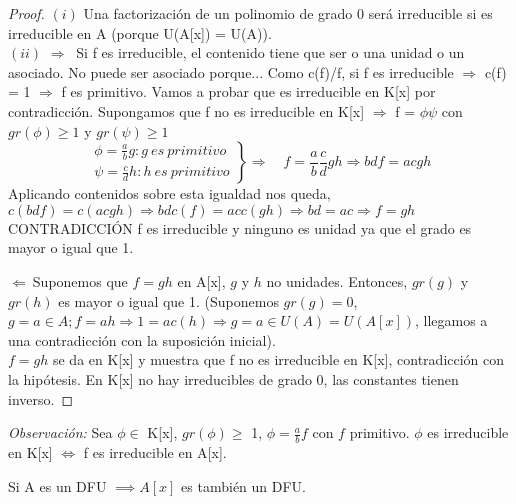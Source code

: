 \begin{proof}
$(i)$ Una factorización de un polinomio de grado 0 será irreducible si es irreducible en A (porque U(A[x]) = U(A)).\\
$(ii)$ $\displaystyle \boxed{\Rightarrow}\ $ Si f es irreducible, el contenido tiene que ser o una unidad o un asociado. No puede ser asociado porque...
Como c(f)/f, si f es irreducible $\Rightarrow$ c(f) = 1 $\Rightarrow$ f es primitivo. Vamos a probar que es irreducible en K[x] por contradicción. Supongamos que f no es irreducible en K[x] $\Rightarrow$ f = $\phi \psi$ con $gr(\phi) \geq 1$ y $gr(\psi) \geq 1$
$$
 \left .
      \begin{matrix}
        \phi =  \frac{a}{b}g : g\ es\ primitivo\\
        \psi =  \frac{c}{d}h : h\ es\ primitivo
      \end{matrix}
   \right \}
   \Longrightarrow \quad f = \frac{a}{b} \frac{c}{d} gh \Rightarrow bdf = acgh
  $$
  Aplicando contenidos sobre esta igualdad nos queda, $c(bdf) = c(acgh) \Rightarrow bdc(f) = acc(gh) \Rightarrow bd = ac \Rightarrow f = gh $ CONTRADICCIÓN f es irreducible y ninguno es unidad ya que el grado es mayor o igual que 1.

$\displaystyle \boxed{\Leftarrow}\ $Suponemos que $f=gh$ en A[x], $g$ y $h$ no unidades. Entonces, $gr(g)$ y $gr(h)$ es mayor o igual que 1. (Suponemos $gr(g)=0$, $g = a \in A; f=ah \Rightarrow 1 = ac(h) \Rightarrow g=a \in U(A)=U(A[x])$, llegamos a una contradicción con la suposición inicial).  \\
$f=gh$ se da en K[x] y muestra que f no es irreducible en K[x], contradicción con la hipótesis.
En K[x] no hay irreducibles de grado 0, las constantes tienen inverso.
\end{proof}

\textit{Observación:} Sea $\phi \in$ K[x], $gr(\phi) \geq$ 1, $\phi=\frac{a}{b}f$ con $f$ primitivo. $\phi$ es irreducible en K[x] $\Leftrightarrow$ f es irreducible en A[x].

\begin{nth}
	Si A es un DFU $\implies A[x]$ es también un DFU.
\end{nth}

